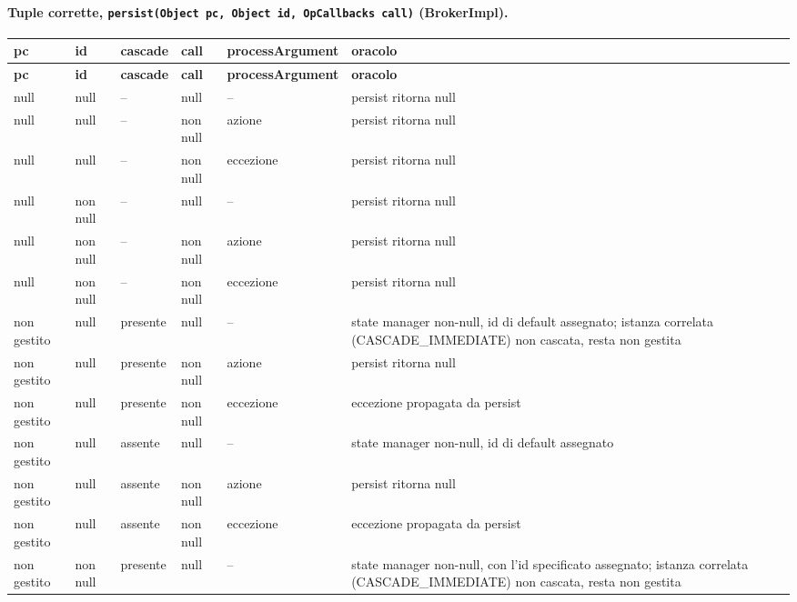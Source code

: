 \paragraph*{Tuple corrette, \texttt{persist(Object pc, Object id, OpCallbacks call)} (BrokerImpl).}

{\footnotesize\setlength{\tabcolsep}{3pt}
\begin{longtable}{>{\raggedright\arraybackslash}p{}>{\raggedright\arraybackslash}p{}>{\raggedright\arraybackslash}p{}>{\raggedright\arraybackslash}p{}>{\raggedright\arraybackslash}p{}>{\raggedright\arraybackslash}p{}}
\toprule
\textbf{pc} & \textbf{id} & \textbf{cascade} & \textbf{call} & \textbf{processArgument} & \textbf{oracolo} \\
\midrule
\endfirsthead
\toprule
\textbf{pc} & \textbf{id} & \textbf{cascade} & \textbf{call} & \textbf{processArgument} & \textbf{oracolo} \\
\midrule
\endhead
\bottomrule
\endfoot
null & null & -- & null & -- & persist ritorna null \\
null & null & -- & non null & azione & persist ritorna null \\
null & null & -- & non null & eccezione & persist ritorna null \\
null & non null & -- & null & -- & persist ritorna null \\
null & non null & -- & non null & azione & persist ritorna null \\
null & non null & -- & non null & eccezione & persist ritorna null \\
non gestito & null & presente & null & -- & state manager non-null, id di default assegnato; istanza correlata (CASCADE\_IMMEDIATE) non cascata, resta non gestita \\
non gestito & null & presente & non null & azione & persist ritorna null \\
non gestito & null & presente & non null & eccezione & eccezione propagata da persist \\
non gestito & null & assente & null & -- & state manager non-null, id di default assegnato \\
non gestito & null & assente & non null & azione & persist ritorna null \\
non gestito & null & assente & non null & eccezione & eccezione propagata da persist \\
non gestito & non null & presente & null & -- & state manager non-null, con l'id specificato assegnato; istanza correlata (CASCADE\_IMMEDIATE) non cascata, resta non gestita \\

\end{longtable}}

